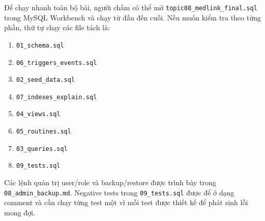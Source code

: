\documentclass[12pt, a4paper, oneside, openany]{report}
\newcommand{\dbid}[1]{{\normalfont\ttfamily\footnotesize\nolinkurl{#1}}}
\begin{document}
Để chạy nhanh toàn bộ bài, người chấm có thể mở \dbid{topic08_medlink_final.sql} trong MySQL Workbench và chạy từ đầu đến cuối. Nếu muốn kiểm tra theo từng phần, thứ tự chạy các file tách là:

\begin{enumerate}
    \item \dbid{01_schema.sql}
    \item \dbid{06_triggers_events.sql}
    \item \dbid{02_seed_data.sql}
    \item \dbid{07_indexes_explain.sql}
    \item \dbid{04_views.sql}
    \item \dbid{05_routines.sql}
    \item \dbid{03_queries.sql}
    \item \dbid{09_tests.sql}
\end{enumerate}

Các lệnh quản trị user/role và backup/restore được trình bày trong \dbid{08_admin_backup.md}. Negative tests trong \dbid{09_tests.sql} được để ở dạng comment và cần chạy từng test một vì mỗi test được thiết kế để phát sinh lỗi mong đợi.
\end{document}
